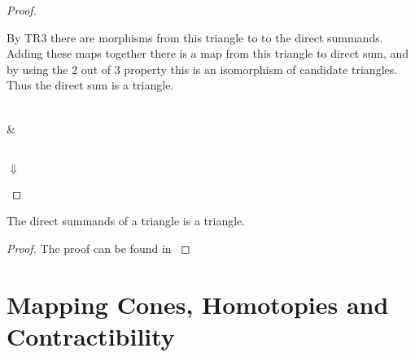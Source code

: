 \begin{proof}
\begin{center}
        \end{center}
        By TR3 there are morphisms from this triangle to to the direct summands. Adding these maps together there is a map from this triangle to direct sum, and by using the 2 out of 3 property this is an isomorphism of candidate triangles. Thus the direct sum is a triangle.
        \begin{center}
             \\
            \& \\
             \\
            $\Downarrow$ \\
        \end{center}
    \end{proof}

    \begin{lemma}
        The direct summands of a triangle is a triangle.
    \end{lemma}

    \begin{proof}
        The proof can be found in \cite{neeman}
    \end{proof}
    

\section{Mapping Cones, Homotopies and Contractibility}

